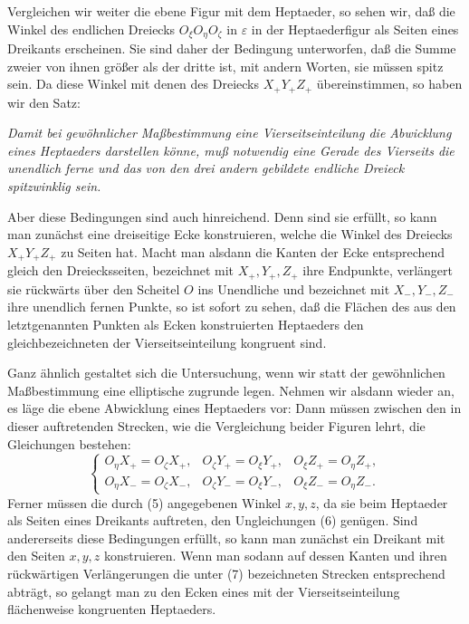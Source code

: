 \documentclass[11pt,a4paper]{article}
\begin{document}
Vergleichen wir weiter die ebene Figur mit dem Heptaeder, so sehen wir, da\ss{} die Winkel des endlichen Dreiecks $O_\xi O_\eta O_\zeta$ in $\varepsilon$ in der Heptaederfigur als Seiten eines Dreikants erscheinen. Sie sind daher der Bedingung unterworfen, da\ss{} die Summe zweier von ihnen gr\"o\ss{}er als der dritte ist, mit andern Worten, sie m\"ussen spitz sein. Da diese Winkel mit denen des Dreiecks $X_+Y_+Z_+$ \"ubereinstimmen, so haben wir den Satz:

\emph{Damit bei gew\"ohnlicher Ma\ss{}bestimmung eine Vierseitseinteilung die Abwicklung eines Heptaeders darstellen k\"onne, mu\ss{} notwendig eine Gerade des Vierseits die unendlich ferne und das von den drei andern gebildete endliche Dreieck spitzwinklig sein.}

Aber diese Bedingungen sind auch hinreichend. Denn sind sie erf\"ullt, so kann man zun\"achst eine dreiseitige Ecke konstruieren, welche die Winkel des Dreiecks $X_+Y_+Z_+$ zu Seiten hat. Macht man alsdann die Kanten der Ecke entsprechend gleich den Dreiecksseiten, bezeichnet mit $X_+,Y_+,Z_+$ ihre Endpunkte, verl\"angert sie r\"uckw\"arts \"uber den Scheitel $O$ ins Unendliche und bezeichnet mit $X_-,Y_-,Z_-$ ihre unendlich fernen Punkte, so ist sofort zu sehen, da\ss{} die Fl\"achen des aus den letztgenannten Punkten als Ecken konstruierten Heptaeders den gleichbezeichneten der Vierseitseinteilung kongruent sind.

Ganz \"ahnlich gestaltet sich die Untersuchung, wenn wir statt der gew\"ohnlichen Ma\ss{}bestimmung eine elliptische zugrunde legen. Nehmen wir alsdann wieder an, es l\"age die ebene Abwicklung eines Heptaeders vor: Dann m\"ussen zwischen den in dieser auftretenden Strecken, wie die Vergleichung beider Figuren lehrt, die Gleichungen bestehen:
\[
\left\{
\begin{array}{lll}
 O_\eta X_+=O_\zeta X_+, & O_\zeta Y_+=O_\xi Y_+, & O_\xi Z_+=O_\eta Z_+,\\
 O_\eta X_-=O_\zeta X_-, & O_\zeta Y_-=O_\xi Y_-, & O_\xi Z_-=O_\eta Z_-.
\end{array}
\right.\tag{7}
\]
Ferner m\"ussen die durch (5) angegebenen Winkel $x,y,z$, da sie beim Heptaeder als Seiten eines Dreikants auftreten, den Ungleichungen (6) gen\"ugen. Sind andererseits diese Bedingungen erf\"ullt, so kann man zun\"achst ein Dreikant mit den Seiten $x,y,z$ konstruieren. Wenn man sodann auf dessen Kanten und ihren r\"uckw\"artigen Verl\"angerungen die unter (7) bezeichneten Strecken entsprechend abtr\"agt, so gelangt man zu den Ecken eines mit der Vierseitseinteilung fl\"achenweise kongruenten Heptaeders.
\end{document}
